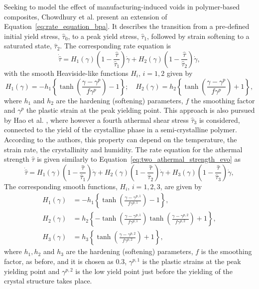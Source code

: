 Seeking to model the effect of manufacturing-induced voids in polymer-based composites, Chowdhury et al. \citep{chowdhuryEffectsManufacturingInducedVoids2008} present an extension of Equation~\eqref{eq:rate_equation_bpa}.
It describes the transition from a pre-defined initial yield stress, $\hat\tau_0$, to a peak yield stress, $\hat\tau_1$, followed by strain softening to a saturated state, $\hat\tau_2$.
The corresponding rate equation is
\begin{equation}
	\label{eq:two_athermal_strength_evo}
	\dot{\hat\tau}=H_1(\gamma)\left(1-\frac{\hat\tau}{\hat\tau_1}\right) \dot{\gamma}+H_2(\gamma)\left(1-\frac{\hat\tau}{\hat\tau_2}\right)\dot{\gamma},
\end{equation}
with the smooth Heaviside-like functions $H_i$, $i=1,2$ given by
\begin{equation}
	H_1(\gamma)=-h_1\left\{\tanh \left(\frac{\gamma-\gamma^p}{f \gamma^p}\right)-1\right\} ; \quad H_2(\gamma)=h_2\left\{\tanh \left(\frac{\gamma-\gamma^p}{f \gamma^p}\right)+1\right\},
\end{equation}
where $h_1$ and $h_2$ are the hardening (softening) parameters, $f$ the smoothing factor and $\gamma^p$ the plastic strain at the peak yielding point.
This approach is also pursued by Hao et al. \citep{haoUnifiedAmorphousCrystalline2022}, where however a fourth athermal shear stress $\hat \tau_3$ is considered, connected to the yield of the crystalline phase in a semi-crystalline polymer.
According to the authors, this property can depend on the temperature, the strain rate, the crystallinity and humidity.
The rate equation for the athermal strength $\hat\tau$ is given similarly to Equation~\eqref{eq:two_athermal_strength_evo} as
\begin{equation}
	\dot{\hat\tau}=H_1(\gamma) \left(1-\frac{\hat\tau}{\hat\tau_1}\right)  \dot{\gamma}+H_2(\gamma) \left(1-\frac{\hat\tau}{\hat\tau_2}\right)  \dot{\gamma}+H_3(\gamma) \left(1-\frac{\hat\tau}{\hat\tau_3}\right)  \dot{\gamma},
\end{equation}
The corresponding smooth functions, $H_i$, $i=1,2,3$, are given by
\begin{align}
	H_1(\gamma)&=-h_1\left\{\tanh \left(\frac{\gamma-\gamma^{p,1}}{f \gamma^{p,1}}\right)-1\right\}, \\
	H_2(\gamma)&=h_2\left\{-\tanh \left(\frac{\gamma-\gamma^{p,1}}{f \gamma^{p,1}}\right) \tanh \left(\frac{\gamma-\gamma^{p,2}}{f \gamma^{p,2}}\right)+1\right\}, \\
	H_3(\gamma)&=h_3\left\{\tanh \left(\frac{\gamma-\gamma^{p,2}}{f \gamma^{p,2}}\right)+1\right\},
\end{align}
where $h_1, h_2$ and $h_3$ are the hardening (softening) parameters, $f$ is the smoothing factor, as before, and it is chosen as $0.3$, $\gamma^{p,1}$ is the plastic strains at the peak yielding point and $\gamma^{p,2}$ is the low yield point just before the yielding of the crystal structure takes place.

